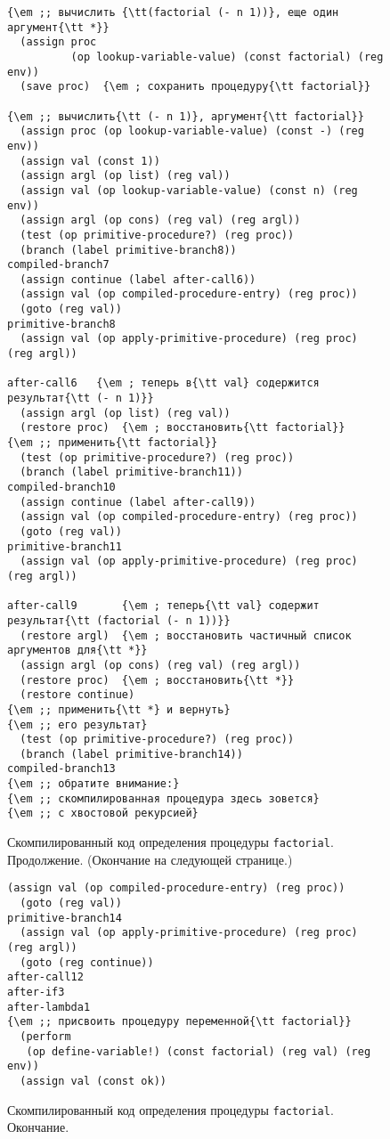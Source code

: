 \begin{figure}[p]
\begin{Verbatim}[fontsize=\small]
{\em ;; вычислить {\tt(factorial (- n 1))}, еще один аргумент{\tt *}}
  (assign proc
          (op lookup-variable-value) (const factorial) (reg env))
  (save proc)  {\em ; сохранить процедуру{\tt factorial}}

{\em ;; вычислить{\tt (- n 1)}, аргумент{\tt factorial}}
  (assign proc (op lookup-variable-value) (const -) (reg env))
  (assign val (const 1))
  (assign argl (op list) (reg val))
  (assign val (op lookup-variable-value) (const n) (reg env))
  (assign argl (op cons) (reg val) (reg argl))
  (test (op primitive-procedure?) (reg proc))
  (branch (label primitive-branch8))
compiled-branch7
  (assign continue (label after-call6))
  (assign val (op compiled-procedure-entry) (reg proc))
  (goto (reg val))
primitive-branch8
  (assign val (op apply-primitive-procedure) (reg proc) (reg argl))

after-call6   {\em ; теперь в{\tt val} содержится результат{\tt (- n 1)}}
  (assign argl (op list) (reg val))
  (restore proc)  {\em ; восстановить{\tt factorial}}
{\em ;; применить{\tt factorial}}
  (test (op primitive-procedure?) (reg proc))
  (branch (label primitive-branch11))
compiled-branch10
  (assign continue (label after-call9))
  (assign val (op compiled-procedure-entry) (reg proc))
  (goto (reg val))
primitive-branch11
  (assign val (op apply-primitive-procedure) (reg proc) (reg argl))

after-call9       {\em ; теперь{\tt val} содержит результат{\tt (factorial (- n 1))}}
  (restore argl)  {\em ; восстановить частичный список аргументов для{\tt *}}
  (assign argl (op cons) (reg val) (reg argl))
  (restore proc)  {\em ; восстановить{\tt *}}
  (restore continue)
{\em ;; применить{\tt *} и вернуть}
{\em ;; его результат}
  (test (op primitive-procedure?) (reg proc))
  (branch (label primitive-branch14))
compiled-branch13
{\em ;; обратите внимание:} 
{\em ;; скомпилированная процедура здесь зовется}
{\em ;; с хвостовой рекурсией}
\end{Verbatim}
\caption{Скомпилированный код определения процедуры {\tt factorial}.
Продолжение. (Окончание на следующей странице.)}
\addtocounter{figure}{-1}
\end{figure}
\begin{figure}[t]
\begin{Verbatim}[fontsize=\small]
  (assign val (op compiled-procedure-entry) (reg proc))
  (goto (reg val))
primitive-branch14
  (assign val (op apply-primitive-procedure) (reg proc) (reg argl))
  (goto (reg continue))
after-call12
after-if3
after-lambda1
{\em ;; присвоить процедуру переменной{\tt factorial}}
  (perform 
   (op define-variable!) (const factorial) (reg val) (reg env))
  (assign val (const ok))
\end{Verbatim}
\caption{Скомпилированный код определения процедуры {\tt factorial}.
Окончание.}
\label{P5.17}
\end{figure}

